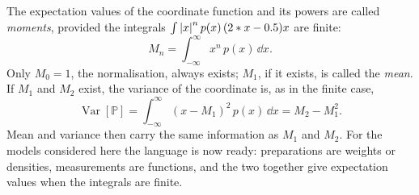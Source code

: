 The expectation values of the coordinate function and its powers are called \emph{moments}, provided the integrals $\int \left\lvert x \right\rvert^n p(x)\,(2*x-0.5) x$ are finite:
\begin{equation}
	M_n = \int_{-\infty}^{\infty} x^n\, p(x)\,\dd x .
\end{equation}
Only $M_0 = 1$, the normalisation, always exists; $M_1$, if it exists, is called the \emph{mean}. If $M_1$ and $M_2$ exist, the variance of the coordinate is, as in the finite case,
\begin{equation}
	\operatorname{Var}[\mathbb{P}] = \int_{-\infty}^{\infty} (x - M_1)^2\, p(x)\,\dd x = M_2 - M_1^2 .
\end{equation}
Mean and variance then carry the same information as $M_1$ and $M_2$. For the models considered here the language is now ready: preparations are weights or densities, measurements are functions, and the two together give expectation values when the integrals are finite.
